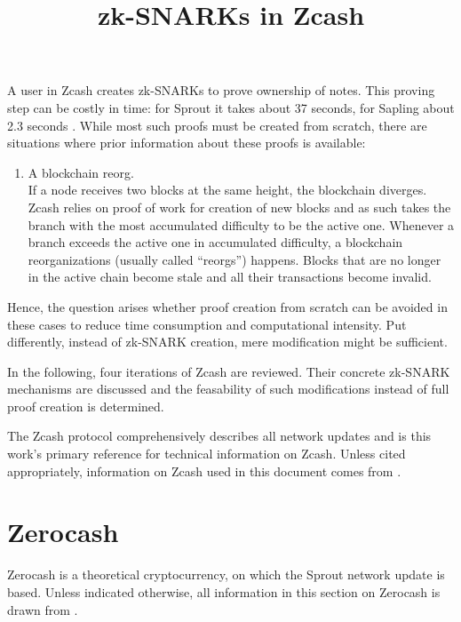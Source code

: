 \documentclass{article}
\title{zk-SNARKs in Zcash}
\date{}
\begin{document}
\maketitle

A user in Zcash creates zk-SNARKs to prove ownership of notes.
This proving step can be costly in time: for Sprout it takes about 37 seconds, for Sapling about 2.3 seconds \cite{electriccoin:provingtime}.
While most such proofs must be created from scratch, there are situations where prior information about these proofs is available:

\begin{enumerate}
        \item A blockchain reorg. \\
        If a node receives two blocks at the same height, the blockchain diverges.
        Zcash relies on proof of work for creation of new blocks and as such takes
        the branch with the most accumulated difficulty to be the active one.
        Whenever a branch exceeds the active one in accumulated difficulty, a blockchain reorganizations (usually called ``reorgs'') happens.
        Blocks that are no longer in the active chain become stale and all their transactions become invalid.
\end{enumerate}

Hence, the question arises whether proof creation from scratch can be avoided in these cases to reduce time consumption and computational intensity.
Put differently, instead of zk-SNARK creation, mere modification might be sufficient.

In the following, four iterations of Zcash are reviewed.
Their concrete zk-SNARK mechanisms are discussed and the feasability of such modifications instead of full proof creation is determined.

The Zcash protocol \cite{hopwood:zcash} comprehensively describes all network updates and is this work's primary reference for technical information on Zcash.
Unless cited appropriately, information on Zcash used in this document comes from \cite{hopwood:zcash}.

\pagebreak

\section{Zerocash}

Zerocash \cite{bensasson:zerocash} is a theoretical cryptocurrency, on which the Sprout network update is based.
Unless indicated otherwise, all information in this section on Zerocash is drawn from \cite{bensasson:zerocash}.
\end{document}
